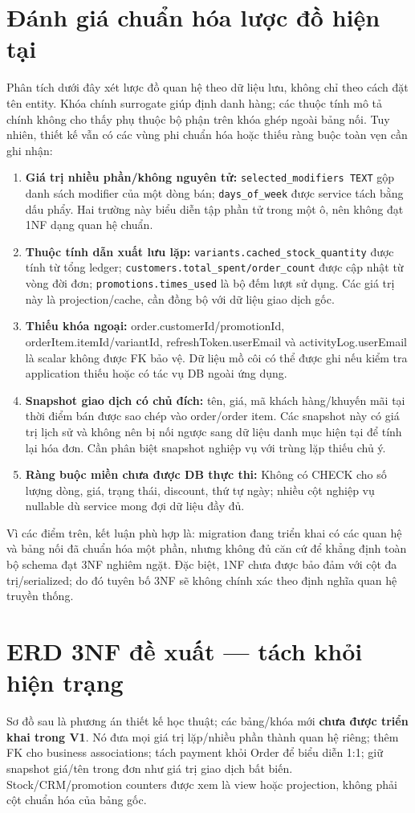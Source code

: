 \documentclass[12pt,a4paper,oneside]{report}
\begin{document}
\section{Đánh giá chuẩn hóa lược đồ hiện tại}
Phân tích dưới đây xét lược đồ quan hệ theo dữ liệu lưu, không chỉ theo cách đặt tên entity. Khóa chính surrogate giúp định danh hàng; các thuộc tính mô tả chính không cho thấy phụ thuộc bộ phận trên khóa ghép ngoài bảng nối. Tuy nhiên, thiết kế vẫn có các vùng phi chuẩn hóa hoặc thiếu ràng buộc toàn vẹn cần ghi nhận:
\begin{enumerate}
\item \textbf{Giá trị nhiều phần/không nguyên tử:} \texttt{selected\_modifiers TEXT} gộp danh sách modifier của một dòng bán; \texttt{days\_of\_week} được service tách bằng dấu phẩy. Hai trường này biểu diễn tập phần tử trong một ô, nên không đạt 1NF dạng quan hệ chuẩn.
\item \textbf{Thuộc tính dẫn xuất lưu lặp:} \texttt{variants.cached\_stock\_quantity} được tính từ tổng ledger; \texttt{customers.total\_spent/order\_count} được cập nhật từ vòng đời đơn; \texttt{promotions.times\_used} là bộ đếm lượt sử dụng. Các giá trị này là projection/cache, cần đồng bộ với dữ liệu giao dịch gốc.
\item \textbf{Thiếu khóa ngoại:} order.customerId/promotionId, orderItem.itemId/variantId, refreshToken.userEmail và activityLog.userEmail là scalar không được FK bảo vệ. Dữ liệu mồ côi có thể được ghi nếu kiểm tra application thiếu hoặc có tác vụ DB ngoài ứng dụng.
\item \textbf{Snapshot giao dịch có chủ đích:} tên, giá, mã khách hàng/khuyến mãi tại thời điểm bán được sao chép vào order/order item. Các snapshot này có giá trị lịch sử và không nên bị nối ngược sang dữ liệu danh mục hiện tại để tính lại hóa đơn. Cần phân biệt snapshot nghiệp vụ với trùng lặp thiếu chủ ý.
\item \textbf{Ràng buộc miền chưa được DB thực thi:} Không có CHECK cho số lượng dòng, giá, trạng thái, discount, thứ tự ngày; nhiều cột nghiệp vụ nullable dù service mong đợi dữ liệu đầy đủ.
\end{enumerate}
Vì các điểm trên, kết luận phù hợp là: migration đang triển khai có các quan hệ và bảng nối đã chuẩn hóa một phần, nhưng không đủ căn cứ để khẳng định toàn bộ schema đạt 3NF nghiêm ngặt. Đặc biệt, 1NF chưa được bảo đảm với cột đa trị/serialized; do đó tuyên bố 3NF sẽ không chính xác theo định nghĩa quan hệ truyền thống.

\section{ERD 3NF đề xuất — tách khỏi hiện trạng}
Sơ đồ sau là phương án thiết kế học thuật; các bảng/khóa mới \textbf{chưa được triển khai trong V1}. Nó đưa mọi giá trị lặp/nhiều phần thành quan hệ riêng; thêm FK cho business associations; tách payment khỏi Order để biểu diễn 1:1; giữ snapshot giá/tên trong đơn như giá trị giao dịch bất biến. Stock/CRM/promotion counters được xem là view hoặc projection, không phải cột chuẩn hóa của bảng gốc.
\end{document}
